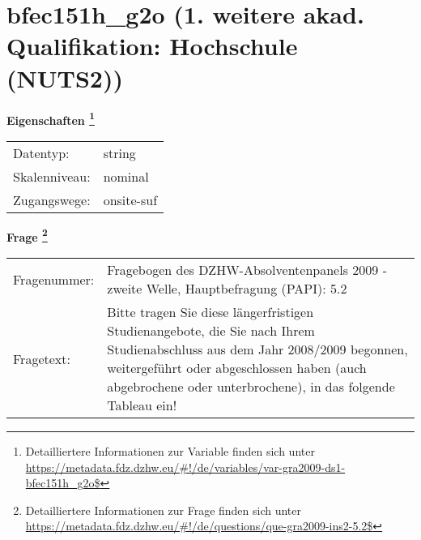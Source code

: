 
    \setcounter{footnote}{0}

    \vspace*{-1.8cm}
	\section{bfec151h\_g2o (1. weitere akad. Qualifikation: Hochschule (NUTS2))}
	\label{section:bfec151h_g2o}



    \vspace*{0.5cm}
    \noindent\textbf{Eigenschaften
	\footnote{Detailliertere Informationen zur Variable finden sich unter
		\url{https://metadata.fdz.dzhw.eu/\#!/de/variables/var-gra2009-ds1-bfec151h_g2o$}}}\\
	\begin{tabularx}{\hsize}{@{}lX}
	Datentyp: & string \\
	Skalenniveau: & nominal \\
	Zugangswege: &
	  onsite-suf
 \\
    \end{tabularx}



				\vspace*{0.5cm}
                \noindent\textbf{Frage
	                \footnote{Detailliertere Informationen zur Frage finden sich unter
		              \url{https://metadata.fdz.dzhw.eu/\#!/de/questions/que-gra2009-ins2-5.2$}}}\\
				\begin{tabularx}{\hsize}{@{}lX}
					Fragenummer: &
					  Fragebogen des DZHW-Absolventenpanels 2009 - zweite Welle, Hauptbefragung (PAPI):
					  5.2
 \\
					Fragetext: & Bitte tragen Sie diese längerfristigen Studienangebote, die Sie nach Ihrem Studienabschluss aus dem Jahr 2008/2009 begonnen, weitergeführt oder abgeschlossen haben (auch abgebrochene oder unterbrochene), in das folgende Tableau ein! \\
				\end{tabularx}





